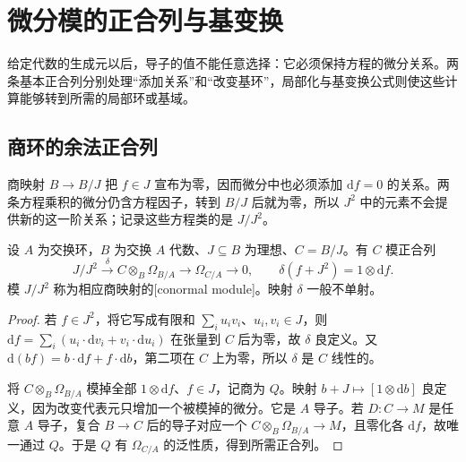 
\section{微分模的正合列与基变换}
\label{b3:sec:1402}


给定代数的生成元以后，导子的值不能任意选择：它必须保持方程的微分关系。两条基本正合列分别处理“添加关系”和“改变基环”，局部化与基变换公式则使这些计算能够转到所需的局部环或基域。

\subsection{商环的余法正合列}
\label{b3:subsec:1402:01}

商映射 \(B\to B/J\) 把 \(f\in J\) 宣布为零，因而微分中也必须添加 \(\mathrm{d}f=0\) 的关系。两条方程乘积的微分仍含方程因子，转到 \(B/J\) 后就为零，所以 \(J^2\) 中的元素不会提供新的这一阶关系；记录这些方程类的是 \(J/J^2\)。

\begin{theorem}[余法正合列]\label{b3:thm:conormal-sequence}
	设 \(A\) 为交换环，\(B\) 为交换 \(A\) 代数、\(J\subseteq B\) 为理想、\(C=B/J\)。有 \(C\) 模正合列
	\[
		J/J^2\xrightarrow{\delta}C\otimes_B\Omega_{B/A} \longrightarrow\Omega_{C/A}\longrightarrow0, \qquad \delta(f+J^2)=1\otimes \mathrm{d}f.
	\]
	模 \(J/J^2\) 称为相应商映射的[conormal module]。映射 \(\delta\) 一般不单射。
\end{theorem}
\begin{proof}
	若 \(f\in J^2\)，将它写成有限和 \(\sum_i u_iv_i\)、\(u_i,v_i\in J\)，则 \(\mathrm{d}f=\sum_i(u_i\cdot\mathrm{d}v_i+v_i\cdot\mathrm{d}u_i)\) 在张量到 \(C\) 后为零，故 \(\delta\) 良定义。又 \(\mathrm{d}(bf)=b\cdot\mathrm{d}f+f\cdot\mathrm{d}b\)，第二项在 \(C\) 上为零，所以 \(\delta\) 是 \(C\) 线性的。

	将 \(C\otimes_B\Omega_{B/A}\) 模掉全部 \(1\otimes \mathrm{d}f\)、\(f\in J\)，记商为 \(Q\)。映射 \(b+J\mapsto[1\otimes \mathrm{d}b]\) 良定义，因为改变代表元只增加一个被模掉的微分。它是 \(A\) 导子。若 \(D:C\rightarrow M\) 是任意 \(A\) 导子，复合 \(B\rightarrow C\) 后的导子对应一个 \(C\otimes_B\Omega_{B/A}\rightarrow M\)，且零化各 \(\mathrm{d}f\)，故唯一通过 \(Q\)。于是 \(Q\) 有 \(\Omega_{C/A}\) 的泛性质，得到所需正合列。
\end{proof}

